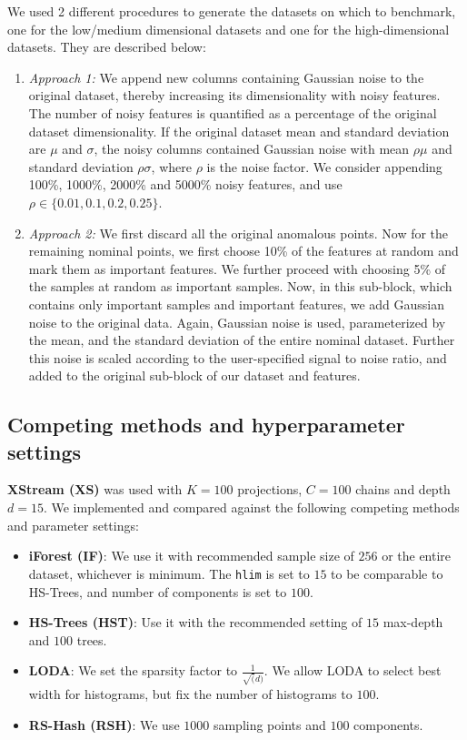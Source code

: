 We used 2 different procedures to generate the datasets on which to benchmark, one for the low/medium dimensional datasets and one for the high-dimensional datasets. They are described below:
\begin{enumerate}
	\item \textit{Approach 1:} We append new columns containing Gaussian noise to the original dataset, thereby increasing its dimensionality with noisy features. The number of noisy features is quantified as a percentage of the original dataset dimensionality. If the original dataset mean and standard deviation are $\mu$ and $\sigma$, the noisy columns contained Gaussian noise with mean $\rho\mu$ and standard deviation $\rho\sigma$, where $\rho$ is the noise factor. We consider appending 100\%, 1000\%, 2000\% and 5000\% noisy features, and use $\rho \in \{0.01, 0.1, 0.2, 0.25\}$.

	\item \textit{Approach 2:} We first discard all the original anomalous points. Now for the remaining nominal points, we first choose 10\% of the features at random and mark them as important features. We further proceed with choosing 5\% of the samples at random as important samples. Now, in this sub-block, which contains only important samples and important features, we add Gaussian noise to the original data. Again, Gaussian noise is used, parameterized by the mean, and the standard deviation of the entire nominal dataset. Further this noise is scaled according to the user-specified signal to noise ratio, and added to the original sub-block of our dataset and features.
\end{enumerate}

\pagebreak

\subsection{Competing methods and hyperparameter settings}

\textbf{XStream (XS)} was used with $K=100$ projections, $C=100$ chains and depth $d=15$. We implemented and compared against the following competing methods and parameter settings:

\begin{itemize}
	\item \textbf{iForest (IF)}: We use it with recommended sample size of $256$ or the entire dataset, whichever is minimum. The \texttt{hlim} is set to $15$ to be comparable to HS-Trees, and number of components is set to $100$.

	\item \textbf{HS-Trees (HST)}:  Use it with the recommended setting of $15$ max-depth and $100$ trees.

	\item \textbf{LODA}: We set the sparsity factor to $\frac{1}{\sqrt(d)}$. We allow LODA to select best width for histograms, but fix the number of histograms to $100$.

	\item \textbf{RS-Hash (RSH)}: We use $1000$ sampling points and $100$ components.
\end{itemize}

